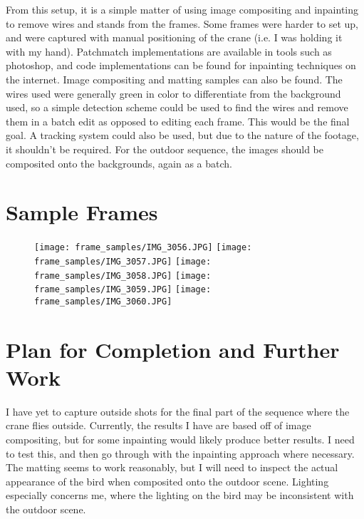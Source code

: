 \documentclass[12pt]{article}
\begin{document}
		From this setup, it is a simple matter of using image compositing and inpainting to remove wires and stands from the frames.  Some frames were harder to set up, and were captured with manual positioning of the crane (i.e. I was holding it with my hand).  Patchmatch implementations are available in tools such as photoshop, and code implementations can be found for inpainting techniques on the internet.  Image compositing and matting samples can also be found.  The wires used were generally green in color to differentiate from the background used, so a simple detection scheme could be used to find the wires and remove them in a batch edit as opposed to editing each frame.  This would be the final goal.  A tracking system could also be used, but due to the nature of the footage, it shouldn't be required.  For the outdoor sequence, the images should be composited onto the backgrounds, again as a batch.
		
	\section{Sample Frames}
		\begin{figure}[H]
			\centering
			\texttt{[image: frame\_samples/IMG\_3056.JPG]}
			\texttt{[image: frame\_samples/IMG\_3057.JPG]}
			\texttt{[image: frame\_samples/IMG\_3058.JPG]}
			\texttt{[image: frame\_samples/IMG\_3059.JPG]}
			\texttt{[image: frame\_samples/IMG\_3060.JPG]}
		\end{figure}
	\section{Plan for Completion and Further Work}
		I have yet to capture outside shots for the final part of the sequence where the crane flies outside.  Currently, the results I have are based off of image compositing, but for some inpainting would likely produce better results.  I need to test this, and then go through with the inpainting approach where necessary.  The matting seems to work reasonably, but I will need to inspect the actual appearance of the bird when composited onto the outdoor scene.  Lighting especially concerns me, where the lighting on the bird may be inconsistent with the outdoor scene.
\end{document}
